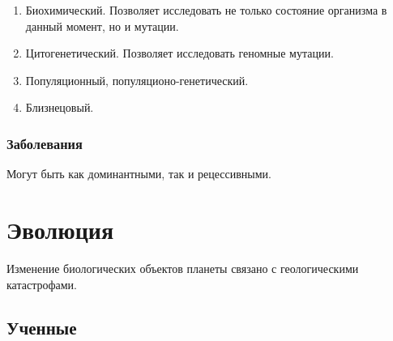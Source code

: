 \documentclass[12pt]{article}
\begin{document}
	\begin{enumerate}
		\item Биохимический. Позволяет исследовать не только состояние организма в данный момент, но и мутации.
		\item Цитогенетический. Позволяет исследовать геномные мутации.
		\item Популяционный, популяционо-генетический.
		\item Близнецовый.
	\end{enumerate}
	
	\subsubsection{Заболевания}
	
	Могут быть как доминантными, так и рецессивными.
	
	\section{Эволюция}
	
	\begin{person}[Кювье]
		Изменение биологических объектов планеты связано с геологическими катастрофами.
	\end{person}
	
	\subsection{Ученные}
	
\end{document}
